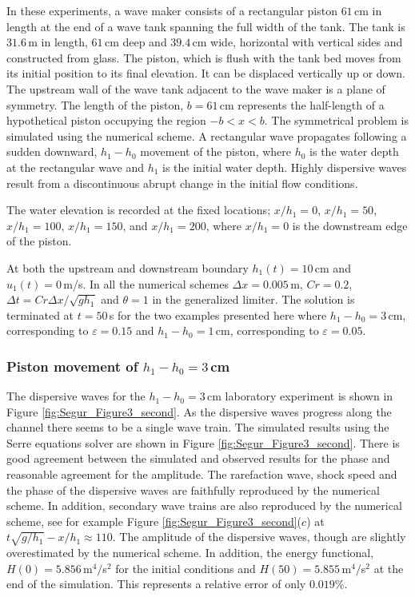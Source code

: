 \documentclass[preprint,sort&compress,1p]{article}
\begin{document}
In these experiments, a wave maker consists of a rectangular piston $61$\,cm in length at the end of a wave tank spanning the full width of the tank. The tank is $31.6$\,m in length, $61$\,cm deep and $39.4$\,cm wide, horizontal with vertical sides and constructed from glass. The piston, which is flush with the tank bed moves from its initial position to its final elevation. It can be displaced vertically up or down. The upstream wall of the wave tank adjacent to the wave maker is a plane of symmetry. The length of the piston, $b = 61$\,cm represents the half-length of a hypothetical piston occupying the region $-b < x < b$. The symmetrical problem is simulated using the numerical scheme. A rectangular wave propagates following a sudden downward, $h_1 - h_0$ movement of the piston, where $h_0$ is the water depth at the rectangular wave and $h_1$ is the initial water depth. Highly dispersive waves result from a discontinuous abrupt change in the initial flow conditions.

The water elevation is recorded at the fixed locations; $x/h_1 = 0$, $x/h_1 = 50$, $x/h_1 = 100$, $x/h_1 = 150$, and $x/h_1 = 200$, where $x/h_1 = 0$ is the downstream edge of the piston.

At both the upstream and downstream boundary  $h_1(t) = 10$\,cm and $u_1(t) = 0$\,m/s. In all the numerical schemes $\Delta x = 0.005$\,m, $Cr = 0.2$, $\Delta t = Cr \Delta x/\sqrt{g h_1}$ and $\theta = 1$ in the generalized limiter. The solution is terminated at $t = 50$\,s for the two examples presented here where $h_1 - h_0 = 3$\,cm, corresponding to $\varepsilon = 0.15$ and $h_1 - h_0 = 1$\,cm, corresponding to $\varepsilon = 0.05$.

\subsubsection{Piston movement of $h_1 - h_0 = 3$\,cm}

The dispersive waves for the $h_1 - h_0 = 3$\,cm laboratory experiment is shown in Figure \ref{fig:Segur_Figure3_second}. As the dispersive waves progress along the channel there seems to be a single wave train. The simulated results using the Serre equations solver are shown in Figure \ref{fig:Segur_Figure3_second}. There is good agreement between the simulated and observed results for the phase and reasonable agreement for the amplitude.  The rarefaction wave, shock speed and the phase of the dispersive waves are faithfully reproduced by the numerical scheme. In addition, secondary wave trains are also reproduced by the numerical scheme, see for example Figure \ref{fig:Segur_Figure3_second}($c$) at $t\sqrt{g/h_1} - x/h_1 \approx 110$. The amplitude of the dispersive waves, though are slightly overestimated by the numerical scheme. In addition, the energy functional, $H(0) = 5.856$\,m$^4/$s$^2$ for the initial conditions and $H(50) = 5.855$\,m$^4/$s$^2$ at the end of the simulation. This represents a relative error of only $0.019\%$.
\end{document}

